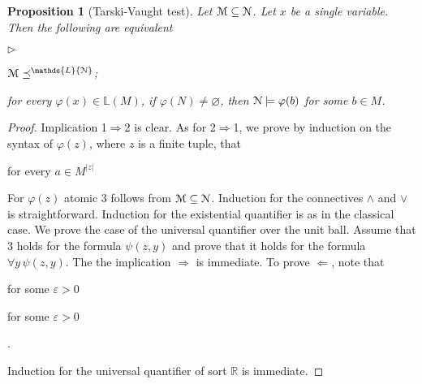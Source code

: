 \documentclass[12pt,letterpaper,oneside,reqno]{amsart}
\newcommand{\mylabel}[1]{{#1}\hfill}
\renewenvironment{itemize}
  {\begin{list}{$\triangleright$}{%
   \setlength{\parskip}{0mm}
   \setlength{\topsep}{.2\baselineskip}
   \setlength{\rightmargin}{0mm}
   \setlength{\listparindent}{0mm}
   \setlength{\itemindent}{0mm}
   \setlength{\labelwidth}{3ex}
   \setlength{\itemsep}{.2\baselineskip}
   \setlength{\parsep}{.2\baselineskip}
   \setlength{\partopsep}{0mm}
   \setlength{\labelsep}{1ex}
   \setlength{\leftmargin}{\labelwidth+\labelsep}
   \let\makelabel\mylabel}}{%
   \end{list}}
\theoremstyle{plain}
\newtheorem{theorem}{Theorem}%
\newtheorem{proposition}[theorem]{Proposition}
\theoremstyle{remark}
\begin{document}
\begin{proposition}[Tarski-Vaught test]\label{prop_Tarski-Vaught} Let ${\EuScript M}\subseteq{\EuScript N}$.
  Let $x$ be a single variable.
  Then the following are equivalent
  \begin{itemize}
    \item[1.] ${\EuScript M}\preceq^\mathds{L}{\EuScript N}$;
    \item[2.] for every $\varphi(x)\in \mathds{L}(M)$, if $\varphi(N)\neq\varnothing$, then ${\EuScript N}\models\varphi(b)$ for some $b\in M$.
  \end{itemize}
\end{proposition}
\begin{proof}

  

  Implication 1$\Rightarrow$2 is clear.
  As for 2$\Rightarrow$1, we prove by induction on the syntax of $\varphi(z)$, where $z$ is a finite tuple, that

   \hfill for every $a\in  M^{|z|}$

  For $\varphi(z)$ atomic 3 follows from ${\EuScript M}\subseteq{\EuScript N}$.
  Induction for the connectives $\wedge$ and $\vee$ is straightforward.
  Induction for the existential quantifier is as in the classical case.
  We prove the case of the universal quantifier over the unit ball.
  Assume that 3 holds for the formula $\psi(z,y)$ and prove that it holds for the formula $\forall y\,\psi(z,y)$.
  The the implication $\Rightarrow$ is immediate.
  To prove $\Leftarrow$, note that

   \hfill for some $\varepsilon>0$

  \hfill for some $\varepsilon>0$

  .

  Induction for the universal quantifier of sort $\mathds{R}$ is immediate.
\end{proof}

\end{document}
